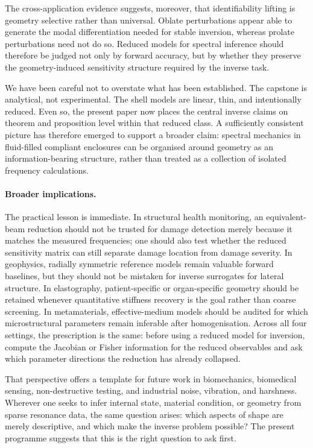The cross-application evidence suggests, moreover, that identifiability lifting
is geometry selective rather than universal.  Oblate perturbations appear able
to generate the modal differentiation needed for stable inversion, whereas
prolate perturbations need not do so.  Reduced models for spectral inference
should therefore be judged not only by forward accuracy, but by whether they
preserve the geometry-induced sensitivity structure required by the inverse task.

We have been careful not to overstate what has been established.  The capstone
is analytical, not experimental.  The shell models are linear, thin, and
intentionally reduced.  Even so, the present paper now places the central
inverse claims on theorem and proposition level within that reduced
class.  A sufficiently consistent picture has therefore emerged to support a
broader claim: spectral mechanics in fluid-filled compliant enclosures can be
organised around geometry as an information-bearing structure, rather than
treated as a collection of isolated frequency calculations.

\paragraph{Broader implications.}
The practical lesson is immediate.  In structural health monitoring, an
equivalent-beam reduction should not be trusted for damage detection merely
because it matches the measured frequencies; one should also test whether the
reduced sensitivity matrix can still separate damage location from damage
severity.  In geophysics, radially symmetric reference models remain valuable
forward baselines, but they should not be mistaken for inverse surrogates for
lateral structure.  In elastography, patient-specific or organ-specific geometry
should be retained whenever quantitative stiffness recovery is the goal rather
than coarse screening.  In metamaterials, effective-medium models should be
audited for which microstructural parameters remain inferable after
homogenisation.  Across all four settings, the prescription is the same: before
using a reduced model for inversion, compute the Jacobian or Fisher information
for the reduced observables and ask which parameter directions the reduction has
already collapsed.

That perspective offers a template for future work in biomechanics, biomedical
sensing, non-destructive testing, and industrial noise, vibration, and harshness.
Wherever one seeks to infer internal state, material condition, or geometry from
sparse resonance data, the same question arises: which aspects of shape are
merely descriptive, and which make the inverse problem possible?  The present
programme suggests that this is the right question to ask first.

